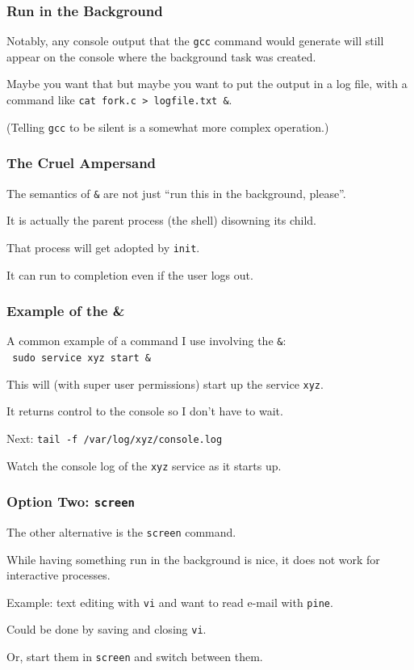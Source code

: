 \begin{frame}
\frametitle{Run in the Background}

Notably, any console output that the \texttt{gcc} command would generate will still appear on the console where the background task was created. 

Maybe you want that but maybe you want to put the output in a log file, with a command like \texttt{cat fork.c > logfile.txt \&}. 

(Telling \texttt{gcc} to be silent is a somewhat more complex operation.) 

\end{frame}

\begin{frame}
\frametitle{The Cruel Ampersand}

The semantics of \texttt{\&} are not just ``run this in the background, please''.

It is actually the parent process (the shell) disowning its child. 

That process will get adopted by \texttt{init}.

It can run to completion even if the user logs out.


\end{frame}

\begin{frame}
\frametitle{Example of the \&}

A common example of a command I use involving the \texttt{\&}:\\
\texttt{ sudo service xyz start \& }

This will (with super user permissions) start up the service \texttt{xyz}.
	
It returns control to the console so I don't have to wait.

Next: \texttt{tail -f /var/log/xyz/console.log}

Watch the console log of the \texttt{xyz} service as it starts up.

\end{frame}

\begin{frame}
\frametitle{Option Two: \texttt{screen}}

The other alternative is the \texttt{screen} command. 

While having something run in the background is nice, it does not work for interactive processes. 

Example: text editing with \texttt{vi} and want to read e-mail with \texttt{pine}.

Could be done by saving and closing \texttt{vi}.

Or, start them in \texttt{screen} and switch between them.

\end{frame}

